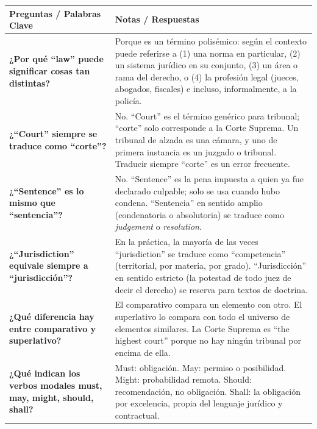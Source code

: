 \documentclass[12pt,oneside]{book}
\begin{document}
\begin{table}[H]
\centering
\begin{tabularx}{\textwidth}{
    >{\raggedright\arraybackslash}p{}
    >{\raggedright\arraybackslash}X
}
\toprule
\textbf{\small Preguntas / Palabras Clave} &
\textbf{\small Notas / Respuestas} \\
\midrule

\textbf{¿Por qué ``law'' puede significar cosas tan distintas?} &
Porque es un término polisémico: según el contexto puede referirse a (1) una norma en particular, (2) un sistema jurídico en su conjunto, (3) un área o rama del derecho, o (4) la profesión legal (jueces, abogados, fiscales) e incluso, informalmente, a la policía. \\

\midrule

\textbf{¿``Court'' siempre se traduce como ``corte''?} &
No. ``Court'' es el término genérico para tribunal; ``corte'' solo corresponde a la Corte Suprema. Un tribunal de alzada es una cámara, y uno de primera instancia es un juzgado o tribunal. Traducir siempre ``corte'' es un error frecuente. \\

\midrule

\textbf{¿``Sentence'' es lo mismo que ``sentencia''?} &
No. ``Sentence'' es la pena impuesta a quien ya fue declarado culpable; solo se usa cuando hubo condena. ``Sentencia'' en sentido amplio (condenatoria o absolutoria) se traduce como \textit{judgement} o \textit{resolution}. \\

\midrule

\textbf{¿``Jurisdiction'' equivale siempre a ``jurisdicción''?} &
En la práctica, la mayoría de las veces ``jurisdiction'' se traduce como ``competencia'' (territorial, por materia, por grado). ``Jurisdicción'' en sentido estricto (la potestad de todo juez de decir el derecho) se reserva para textos de doctrina. \\

\midrule

\textbf{¿Qué diferencia hay entre comparativo y superlativo?} &
El comparativo compara un elemento con otro. El superlativo lo compara con todo el universo de elementos similares. La Corte Suprema es ``the highest court'' porque no hay ningún tribunal por encima de ella. \\

\midrule

\textbf{¿Qué indican los verbos modales must, may, might, should, shall?} &
Must: obligación. May: permiso o posibilidad. Might: probabilidad remota. Should: recomendación, no obligación. Shall: la obligación por excelencia, propia del lenguaje jurídico y contractual. \\


\end{tabularx}
\end{table}
\end{document}
